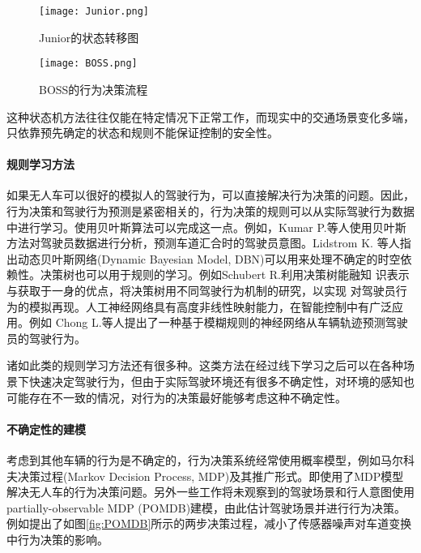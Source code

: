       \begin{figure}[htbp]
      \centering
      \texttt{[image: Junior.png]}
      \caption[Junior的状态转移图]{Junior的状态转移图\cite{Montemerlo2008Junior}}
      \label{fig:junior}
      \end{figure}

      \begin{figure}[htbp]
      \centering
      \texttt{[image: BOSS.png]}
      \caption[BOSS的行为决策流程]{BOSS的行为决策流程\cite{Baker2008Traffic}}
      \label{fig:boss}
      \end{figure}

      这种状态机方法往往仅能在特定情况下正常工作，而现实中的交通场景变化多端，只依靠预先确定的状态和规则不能保证控制的安全性。

      \paragraph{规则学习方法}
      如果无人车可以很好的模拟人的驾驶行为，可以直接解决行为决策的问题。因此，行为决策和驾驶行为预测是紧密相关的，行为决策的规则可以从实际驾驶行为数据中进行学习。使用贝叶斯算法可以完成这一点。例如，Kumar P.等人\cite{Kumar2013Learning}使用贝叶斯方法对驾驶员数据进行分析，预测车道汇合时的驾驶员意图。Lidstrom K. 等人\cite{Lidstrom2008Model}指出动态贝叶斯网络(Dynamic Bayesian Model, DBN)可以用来处理不确定的时空依赖性。决策树也可以用于规则的学习。例如Schubert R.\cite{Schubert2012Evaluating}利用决策树能融知 识表示与获取于一身的优点，将决策树用不同驾驶行为机制的研究，以实现 对驾驶员行为的模拟再现。人工神经网络具有高度非线性映射能力，在智能控制中有广泛应用。例如 Chong L.等人\cite{Chong2013A}提出了一种基于模糊规则的神经网络从车辆轨迹预测驾驶员的驾驶行为。

      诸如此类的规则学习方法还有很多种。这类方法在经过线下学习之后可以在各种场景下快速决定驾驶行为，但由于实际驾驶环境还有很多不确定性，对环境的感知也可能存在不一致的情况，对行为的决策最好能够考虑这种不确定性。

      \paragraph{不确定性的建模}
      考虑到其他车辆的行为是不确定的，行为决策系统经常使用概率模型，例如马尔科夫决策过程(Markov Decision Process, MDP)及其推广形式。\cite{Brechtel2011Probabilistic}即使用了MDP模型解决无人车的行为决策问题。另外一些工作将未观察到的驾驶场景和行人意图使用 partially-observable MDP (POMDB)建模，由此估计驾驶场景并进行行为决策。例如\cite{Ulbrich2013Probabilistic}提出了如图\ref{fig:POMDB}所示的两步决策过程，减小了传感器噪声对车道变换中行为决策的影响。

